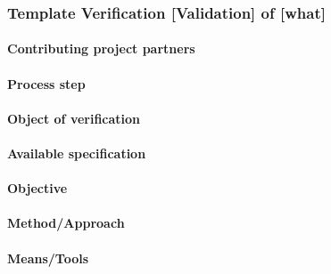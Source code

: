

\subsubsection{Template Verification [Validation] of [what] }
\label{sec:}

\paragraph{Contributing project partners}

\paragraph{Process step}

\paragraph{Object of verification}


\paragraph{Available specification}

\paragraph{Objective}


\paragraph{Method/Approach}

\paragraph{Means/Tools}

